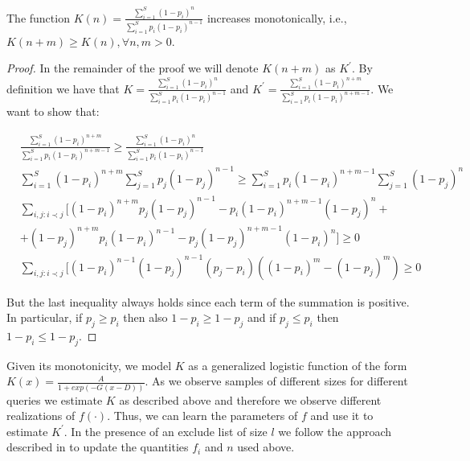 \begin{lemma}
\label{monotonicity}
The function $K(n) = \frac{\sum_{i=1}^S (1-p_i)^n}{\sum_{i=1}^S p_i(1-p_i)^{n-1}}$ increases monotonically, i.e., $K(n+m) \geq K(n), \forall n,m > 0$.
\end{lemma}
\iftr
\begin{proof}
In the remainder of the proof we will denote $K(n+m)$ as $K^{\prime}$. By definition we have that $K = \frac{\sum_{i=1}^S (1-p_i)^n}{\sum_{i=1}^S p_i(1-p_i)^{n-1}}$ and $K^{\prime} = \frac{\sum_{i=1}^S (1-p_i)^{n+m}}{\sum_{i=1}^S p_i(1-p_i)^{n+m-1}}$. We want to show that:

{\small
\begin{align}
&\frac{\sum_{i=1}^S (1-p_i)^{n+m}}{\sum_{i=1}^S p_i(1-p_i)^{n+m-1}} \geq \frac{\sum_{i=1}^S (1-p_i)^n}{\sum_{i=1}^S p_i(1-p_i)^{n-1}} \nonumber \\
&\sum_{i=1}^S (1-p_i)^{n+m}\sum_{j=1}^S p_j(1-p_j)^{n-1} \geq \sum_{i=1}^S p_i(1-p_i)^{n+m-1}\sum_{j=1}^S (1-p_j)^n\nonumber \\
&\sum_{i,j:i\prec j}[(1-p_i)^{n+m}p_j(1-p_j)^{n-1} - p_i(1-p_i)^{n+m-1}(1-p_j)^n + \nonumber \\
& + (1-p_j)^{n+m}p_i(1-p_i)^{n-1} - p_j(1-p_j)^{n+m-1}(1-p_i)^n] \geq 0 \nonumber \\
&\sum_{i,j:i\prec j}[(1-p_i)^{n-1}(1-p_j)^{n-1}(p_j-p_i)((1-p_i)^{m} - (1-p_j)^{m}) \geq 0
\end{align}}

But the last inequality always holds since each term of the summation is positive. In particular, if $p_j \geq p_i$ then
also $1-p_i \geq 1-p_j$ and if $p_j \leq p_i$ then $1-p_i \leq 1-p_j$.
\end{proof}
\fi
Given its monotonicity, we model $K$ as a generalized logistic function of the form $K(x) = \frac{A}{1+exp(-G(x-D))}$. As we observe samples of different sizes for different queries we estimate $K$ as described above and therefore we observe different realizations of $f(\cdot)$. Thus, we can learn the parameters of $f$ and use it to estimate $K^{\prime}$. In the presence of an exclude list of size $l$ we follow the approach described in  to update the quantities $f_i$ and $n$ used above. 
 
